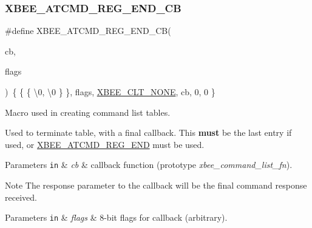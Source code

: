 \subsubsection{\texorpdfstring{X\+B\+E\+E\+\_\+\+A\+T\+C\+M\+D\+\_\+\+R\+E\+G\+\_\+\+E\+N\+D\+\_\+\+CB}{XBEE\_ATCMD\_REG\_END\_CB}}
{\footnotesize\ttfamily \#define X\+B\+E\+E\+\_\+\+A\+T\+C\+M\+D\+\_\+\+R\+E\+G\+\_\+\+E\+N\+D\+\_\+\+CB(\begin{DoxyParamCaption}\item[{}]{cb,  }\item[{}]{flags }\end{DoxyParamCaption})~\{ \{ \{ \textquotesingle{}\textbackslash{}0\textquotesingle{}, \textquotesingle{}\textbackslash{}0\textquotesingle{} \} \}, flags, \hyperlink{group__xbee__atcmd_gga1bd8ecd38c107579d20ded3c79a7d70ba01bd43706bd844415cc0882b861df4d1}{X\+B\+E\+E\+\_\+\+C\+L\+T\+\_\+\+N\+O\+NE}, cb, 0, 0 \}}



Macro used in creating command list tables. 

Used to terminate table, with a final callback. This {\bfseries must} be the last entry if used, or \hyperlink{group__xbee__atcmd_ga22fe547f7ae9fd0b090c5e45f03c162d}{X\+B\+E\+E\+\_\+\+A\+T\+C\+M\+D\+\_\+\+R\+E\+G\+\_\+\+E\+ND} must be used.


\begin{DoxyParams}[1]{Parameters}
\mbox{\tt in}  & {\em cb} & callback function (prototype {\itshape xbee\+\_\+command\+\_\+list\+\_\+fn}). \\
\hline
\end{DoxyParams}
\begin{DoxyNote}{Note}
The \textquotesingle{}response\textquotesingle{} parameter to the callback will be the final command response received. 
\end{DoxyNote}

\begin{DoxyParams}[1]{Parameters}
\mbox{\tt in}  & {\em flags} & 8-\/bit flags for callback (arbitrary). \\
\hline
\end{DoxyParams}
\mbox{\label{group__xbee__atcmd_gaaed20e2dcb547e8a3256e1168e1c95b0}} 

